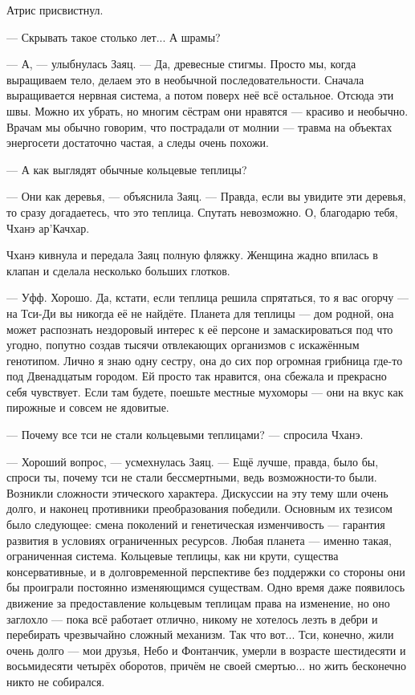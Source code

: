 Атрис присвистнул.

--- Скрывать такое столько лет...
А шрамы?

--- А, --- улыбнулась Заяц.
--- Да, древесные стигмы.
Просто мы, когда выращиваем тело, делаем это в необычной последовательности.
Сначала выращивается нервная система, а потом поверх неё всё остальное.
Отсюда эти швы.
Можно их убрать, но многим сёстрам они нравятся --- красиво и необычно.
Врачам мы обычно говорим, что пострадали от молнии --- травма на объектах энергосети достаточно частая, а следы очень похожи.

--- А как выглядят обычные кольцевые теплицы?

--- Они как деревья, --- объяснила Заяц.
--- Правда, если вы увидите эти деревья, то сразу догадаетесь, что это теплица.
Спутать невозможно.
О, благодарю тебя, Чханэ ар’Качхар.

Чханэ кивнула и передала Заяц полную фляжку.
Женщина жадно впилась в клапан и сделала несколько больших глотков.

--- Уфф.
Хорошо.
Да, кстати, если теплица решила спрятаться, то я вас огорчу --- на Тси-Ди вы никогда её не найдёте.
Планета для теплицы --- дом родной, она может распознать нездоровый интерес к её персоне и замаскироваться под что угодно, попутно создав тысячи отвлекающих организмов с искажённым генотипом.
Лично я знаю одну сестру, она до сих пор огромная грибница где-то под Двенадцатым городом.
Ей просто так нравится, она сбежала и прекрасно себя чувствует.
Если там будете, поешьте местные мухоморы --- они на вкус как пирожные и совсем не ядовитые.

--- Почему все тси не стали кольцевыми теплицами? --- спросила Чханэ.

--- Хороший вопрос, --- усмехнулась Заяц.
--- Ещё лучше, правда, было бы, спроси ты, почему тси не стали бессмертными, ведь возможности-то были.
Возникли сложности этического характера.
Дискуссии на эту тему шли очень долго, и наконец противники преобразования победили.
Основным их тезисом было следующее: смена поколений и генетическая изменчивость --- гарантия развития в условиях ограниченных ресурсов.
Любая планета --- именно такая, ограниченная система.
Кольцевые теплицы, как ни крути, существа консервативные, и в долговременной перспективе без поддержки со стороны они бы проиграли постоянно изменяющимся существам.
Одно время даже появилось движение за предоставление кольцевым теплицам права на изменение, но оно заглохло --- пока всё работает отлично, никому не хотелось лезть в дебри и перебирать чрезвычайно сложный механизм.
Так что вот...
Тси, конечно, жили очень долго --- мои друзья, Небо и Фонтанчик, умерли в возрасте шестидесяти и восьмидесяти четырёх оборотов\FM, причём не своей смертью... но жить бесконечно никто не собирался.

